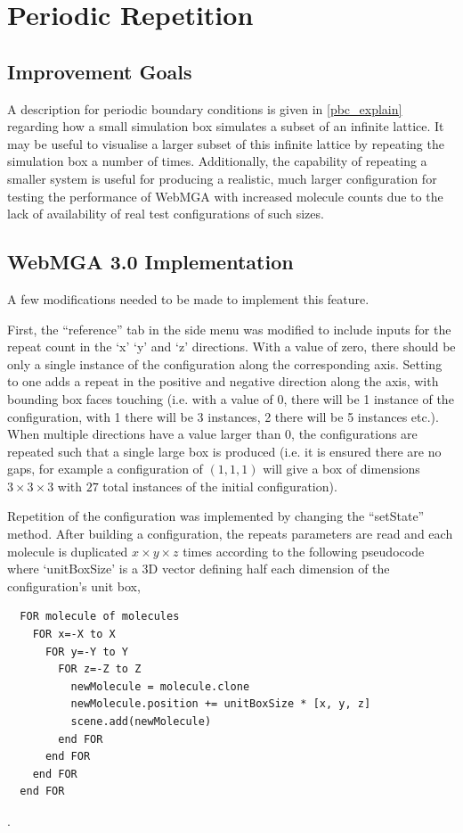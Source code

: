\section{Periodic Repetition}
\label{peridodic_section}
\subsection{Improvement Goals}
A description for periodic boundary conditions is given in \cref{pbc_explain} regarding how a small simulation box simulates a subset of an infinite lattice. It may be useful to visualise a larger subset of this infinite lattice by repeating the simulation box a number of times. Additionally, the capability of repeating a smaller system is useful for producing a realistic, much larger configuration for testing the performance of WebMGA with increased molecule counts due to the lack of availability of real test configurations of such sizes.

\subsection{WebMGA 3.0 Implementation}
A few modifications needed to be made to implement this feature.

First, the ``reference'' tab in the side menu was modified to include inputs for the repeat count in the `x' `y' and `z' directions. With a value of zero, there should be only a single instance of the configuration along the corresponding axis. Setting to one adds a repeat in the positive and negative direction along the axis, with bounding box faces touching (i.e. with a value of 0, there will be 1 instance of the configuration, with 1 there will be 3 instances, 2 there will be 5 instances etc.). When multiple directions have a value larger than 0, the configurations are repeated such that a single large box is produced (i.e. it is ensured there are no gaps, for example a configuration of $(1,1,1)$ will give a box of dimensions $3\times 3\times 3$ with $27$ total instances of the initial configuration).

Repetition of the configuration was implemented by changing the ``setState'' method. After building a configuration, the repeats parameters are read and each molecule is duplicated $x \times y \times z$ times according to the following pseudocode where `unitBoxSize' is a 3D vector defining half each dimension of the configuration's unit box,

\begin{lstlisting}
  FOR molecule of molecules
    FOR x=-X to X
      FOR y=-Y to Y
        FOR z=-Z to Z
          newMolecule = molecule.clone
          newMolecule.position += unitBoxSize * [x, y, z]
          scene.add(newMolecule)
        end FOR
      end FOR
    end FOR
  end FOR
\end{lstlisting}.

